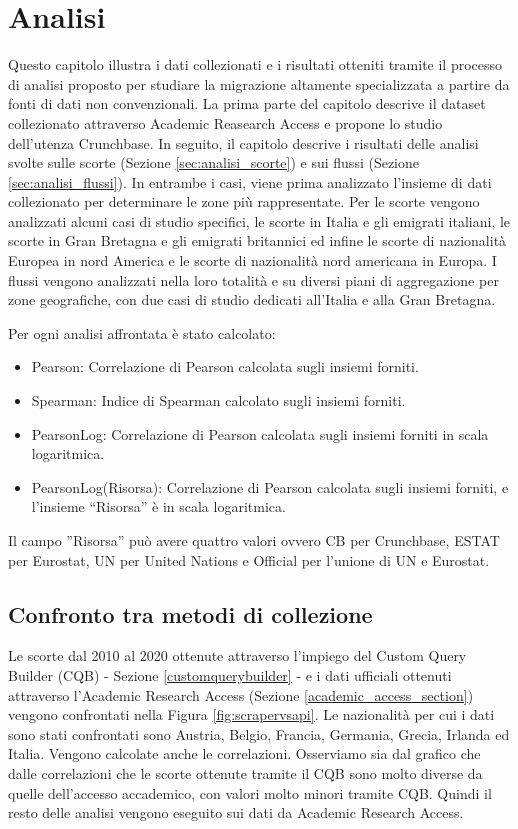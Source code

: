 \chapter{Analisi}
\label{capitoloanalisi}
Questo capitolo illustra i dati collezionati e i risultati otteniti tramite il processo di analisi proposto per studiare la migrazione altamente specializzata a partire da fonti di dati non convenzionali.  
La prima parte del capitolo descrive il dataset collezionato attraverso Academic Reasearch Access e propone lo studio dell'utenza Crunchbase. 
In seguito, il capitolo descrive i risultati delle analisi svolte sulle scorte (Sezione \ref{sec:analisi_scorte}) e sui flussi (Sezione \ref{sec:analisi_flussi}). In entrambe i casi, viene prima analizzato l'insieme di dati collezionato per determinare le zone più rappresentate.
Per le scorte vengono analizzati alcuni casi di studio specifici, le scorte in Italia e gli emigrati italiani, le scorte in Gran Bretagna e gli emigrati britannici ed infine le scorte di nazionalità Europea in nord America e le scorte di nazionalità nord americana in Europa.
I flussi vengono analizzati nella loro totalità e su diversi piani di aggregazione per zone geografiche, con due casi di studio dedicati all'Italia e alla Gran Bretagna. 

Per ogni analisi affrontata è stato calcolato:
\begin{itemize}
    \item Pearson: Correlazione di Pearson calcolata sugli insiemi forniti.
    \item Spearman: Indice di Spearman calcolato sugli insiemi forniti.
    \item PearsonLog: Correlazione di Pearson calcolata sugli insiemi forniti in scala logaritmica.
    \item PearsonLog(Risorsa): Correlazione di Pearson calcolata sugli insiemi forniti, e l'insieme ``Risorsa'' è in scala logaritmica.
\end{itemize}
Il campo ''Risorsa'' può avere quattro valori ovvero CB per Crunchbase, ESTAT per Eurostat, UN per United Nations e Official per l'unione di UN e Eurostat.


\section{Confronto tra metodi di collezione} 
\label{validazionedaticollezionati}

Le scorte dal 2010 al 2020 ottenute attraverso l'impiego del Custom Query Builder (CQB) - Sezione \ref{customquerybuilder} -  e i dati ufficiali ottenuti attraverso l'Academic Research Access (Sezione \ref{academic_access_section}) vengono confrontati nella Figura \ref{fig:scrapervsapi}. Le nazionalità per cui i dati sono stati confrontati sono Austria, Belgio, Francia, Germania, Grecia, Irlanda ed Italia. Vengono calcolate anche le correlazioni. Osserviamo sia dal grafico che dalle correlazioni che le scorte ottenute tramite il CQB sono molto diverse da quelle dell'accesso accademico, con valori molto minori tramite CQB. Quindi il resto delle analisi vengono eseguito sui dati da Academic Research Access. 

